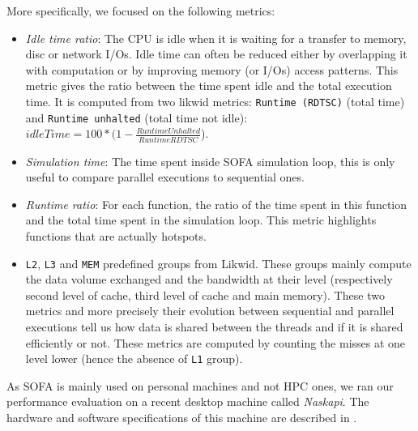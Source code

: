 More specifically, we focused on the following metrics:
\begin{itemize}
    \item \emph{Idle time ratio}: The CPU is idle when it is waiting for a transfer to memory,  disc or network \glspl{I/O}.
        Idle time can often be reduced either by overlapping it with computation or by improving memory (or \glspl{I/O}) access patterns.
        This metric gives the ratio between the time spent idle and the total execution time.
        It is computed from two likwid metrics: \texttt{Runtime (RDTSC)} (total time) and \texttt{Runtime unhalted} (total time not idle): $idleTime=100*(1-\frac{RuntimeUnhalted}{RuntimeRDTSC}$).
    \item \emph{Simulation time}: The time spent inside \gls{SOFA} simulation loop, this is only useful to compare parallel executions to sequential ones.
    \item \emph{Runtime ratio}: For each function, the ratio of the time spent in this function and the total time spent in the simulation loop.
        This metric highlights functions that are actually hotspots.
    \item \texttt{L2}, \texttt{L3} and \texttt{MEM} predefined groups from \gls{Likwid}.
        These groups mainly compute the data volume exchanged and the bandwidth at their level (respectively second level of cache, third level of cache and main memory).
        These two metrics and more precisely their evolution between sequential and parallel executions tell us how data is shared between the threads and if it is shared efficiently or not.
        These metrics are computed by counting the misses at one level lower (hence the absence of \texttt{L1} group).
\end{itemize}

As \gls{SOFA} is mainly used on personal machines and not \gls{HPC} ones, we ran our performance evaluation on a recent desktop machine called \emph{Naskapi}.
The hardware and software specifications of this machine are described in .

